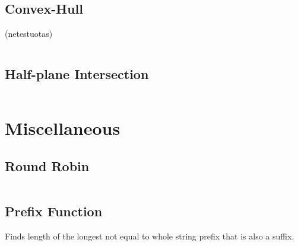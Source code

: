 \documentclass[8pt,a4paper,landscape,oneside]{amsart}
\newcommand{\code}[1]{\inputminted[fontsize=\normalsize,baselinestretch=1]{cpp}{_code/#1}}
\begin{document}
\begin{multicols*}{3}
	\code{geometry/circle_line_intersection.cpp}
	
	\subsection{Convex-Hull}
	
	(netestuotas)
	
	\code{geometry/convex_hull.cpp}

	\subsection{Half-plane Intersection}
	
	\code{geometry/half_plane_intersection.cpp}
	
\section{Miscellaneous}

	\subsection{Round Robin}

	\code{miscellaneous/round_robin.cpp}
	
	\subsection{Prefix Function}
	
	Finds length of the longest not equal to whole string prefix that is also a suffix.
	
	\code{miscellaneous/prefix_function.cpp}

\end{multicols*}
\end{document}
